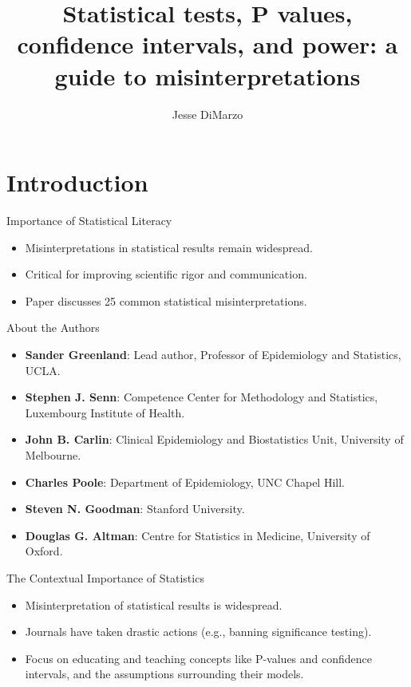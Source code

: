 \documentclass[aspectratio=169, 12pt]{beamer}
\title{Statistical tests, P values, confidence intervals, and power: a guide
to misinterpretations}
\author{Jesse DiMarzo}
\date{}
\begin{document}
 
\frame{\titlepage}

 
\section{Introduction}
\begin{frame}{Importance of Statistical Literacy}
\begin{itemize}
    \item Misinterpretations in statistical results remain widespread.
    \vspace{0.5cm}
    \item Critical for improving scientific rigor and communication. 
    \vspace{0.5cm}
    \item Paper discusses 25 common statistical misinterpretations.
\end{itemize}
\end{frame}


\begin{frame}{About the Authors}
\begin{itemize}
    \item \textbf{Sander Greenland}: Lead author, Professor of Epidemiology and Statistics, UCLA.
    \item \textbf{Stephen J. Senn}: Competence Center for Methodology and Statistics, Luxembourg Institute of Health.
    \item \textbf{John B. Carlin}: Clinical Epidemiology and Biostatistics Unit, University of Melbourne.
    \item \textbf{Charles Poole}: Department of Epidemiology, UNC Chapel Hill.
    \item \textbf{Steven N. Goodman}: Stanford University.
    \item \textbf{Douglas G. Altman}: Centre for Statistics in Medicine, University of Oxford.
\end{itemize}
\end{frame}



\begin{frame}{The Contextual Importance of Statistics}
\begin{itemize}
    \item Misinterpretation of statistical results is widespread.
    \vspace{0.5cm}
    \item Journals have taken drastic actions (e.g., banning significance testing).
    \vspace{0.5cm}
    \item Focus on educating and teaching concepts like P-values and confidence intervals, and the assumptions surrounding their models.
\end{itemize}
\end{frame}
\end{document}
